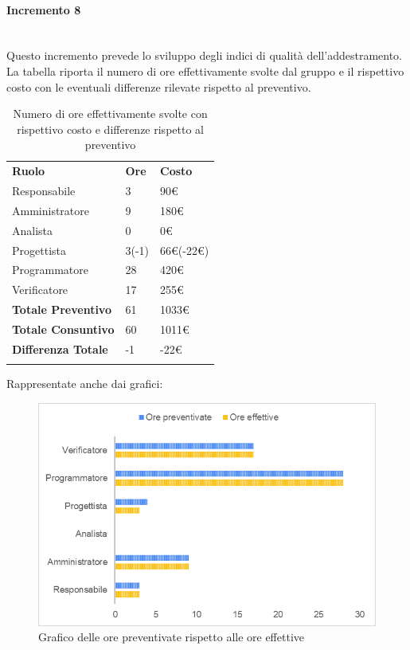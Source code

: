 \paragraph{Incremento 8} \mbox{} \\
Questo incremento prevede lo sviluppo degli indici di qualità dell'addestramento. \\
La tabella riporta il numero di ore effettivamente svolte dal gruppo e il rispettivo costo con le eventuali differenze rilevate rispetto al preventivo.
\begin{longtable} {							
		>{}p{40mm}  
		>{}p{20mm}	
		>{}p{28mm}			
	}			
	\rowcolor{gray!50}
	
	\textbf{Ruolo}            & \textbf{Ore} & \textbf{Costo}       \TBstrut \\
	Responsabile              & 3            & 90\euro              \TBstrut \\
	Amministratore            & 9            & 180\euro             \TBstrut \\
	Analista                  & 0            & 0\euro               \TBstrut \\
	Progettista               & 3(-1)        & 66\euro(-22\euro)    \TBstrut \\
	Programmatore             & 28           & 420\euro             \TBstrut \\
	Verificatore              & 17           & 255\euro             \TBstrut \\
	\textbf{Totale Preventivo}& 61           & 1033\euro            \TBstrut \\	
	\textbf{Totale Consuntivo}& 60           & 1011\euro            \TBstrut \\	
	\textbf{Differenza Totale}& -1           & -22\euro              \TBstrut \\
	\rowcolor{white}
	\caption{Numero di ore effettivamente svolte con rispettivo costo e differenze rispetto al preventivo}	
\end{longtable}

Rappresentate anche dai grafici:
\begin{figure} [H]
	\includegraphics[width=\linewidth]{./img/Grafici/ra-consuntivo3.png}
	\caption{Grafico delle ore preventivate rispetto alle ore effettive}
\end{figure}

